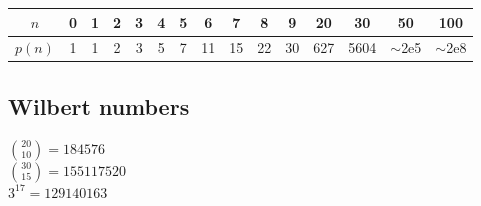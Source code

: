 		\begin{center}
		\begin{tabular}{c|c@{\ }c@{\ }c@{\ }c@{\ }c@{\ }c@{\ }c@{\ }c@{\ }c@{\ }c@{\ }c@{\ }c@{\ }c@{\ }c}
      $n$    & 0 & 1 & 2 & 3 & 4 & 5 & 6  & 7  & 8  & 9  & 20  & 30  & 50  & 100 \\ \hline
      $p(n)$ & 1 & 1 & 2 & 3 & 5 & 7 & 11 & 15 & 22 & 30 & 627 & 5604 & $\mathtt{\sim}$2e5 & $\mathtt{\sim}$2e8 \\
		\end{tabular}
		\end{center}

  \subsection{Wilbert numbers}
    $\binom{20}{10} = 184576$ \\
    $\binom{30}{15} = 155117520$ \\
    $3^17 = 129140163$

